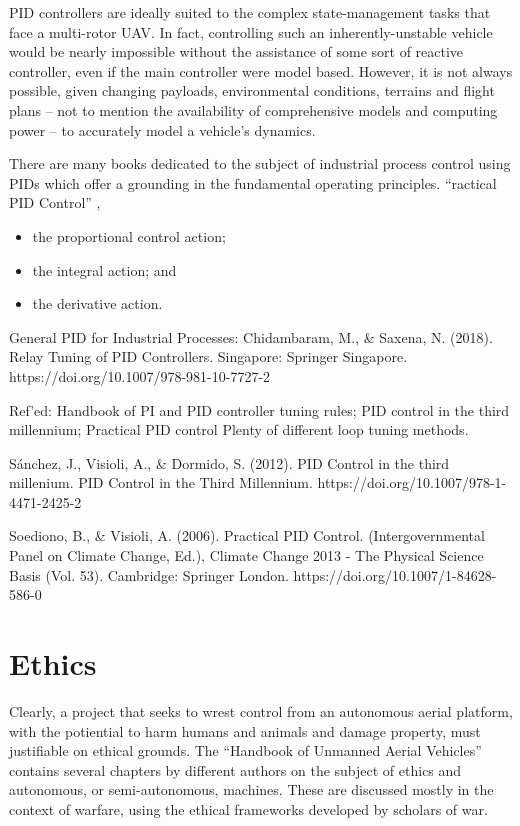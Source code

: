 \documentclass[10pt]{article}
\begin{document}
PID controllers are ideally suited to the complex state-management tasks that face a multi-rotor UAV. In fact, controlling such an inherently-unstable vehicle would be nearly impossible without the assistance of some sort of reactive controller, even if the main controller were model based. However, it is not always possible, given changing payloads, environmental conditions, terrains and flight plans -- not to mention the availability of comprehensive models and computing power -- to accurately model a vehicle’s dynamics.

There are many books dedicated to the subject of industrial process control using PIDs which offer a grounding in the fundamental operating principles. ``ractical PID Control'' \cite{Soediono1989}, 

\begin{itemize}
\item the proportional control action;
\item the integral action; and
\item the derivative action.
\end{itemize}

General PID for Industrial Processes:
\cite{Saxena}
Chidambaram, M., \& Saxena, N. (2018). Relay Tuning of PID Controllers. Singapore: Springer Singapore. https://doi.org/10.1007/978-981-10-7727-2

Ref’ed: Handbook of PI and  PID controller tuning rules; PID control in the third millennium; Practical PID control
Plenty of different loop tuning methods.

\cite{Sanchez2012}
Sánchez, J., Visioli, A., \& Dormido, S. (2012). PID Control in the third millenium. PID Control in the Third Millennium. https://doi.org/10.1007/978-1-4471-2425-2

\cite{Soediono1989}
Soediono, B., \& Visioli, A. (2006). Practical PID Control. (Intergovernmental Panel on Climate Change, Ed.), Climate Change 2013 - The Physical Science Basis (Vol. 53). Cambridge: Springer London. https://doi.org/10.1007/1-84628-586-0

\section{Ethics}

Clearly, a project that seeks to wrest control from an autonomous aerial platform, with the potiential to harm humans and animals and damage property, must justifiable on ethical grounds. The ``Handbook of Unmanned Aerial Vehicles'' \cite{Valavanis2015j} contains several chapters by different authors on the subject of ethics and autonomous, or semi-autonomous, machines. These are discussed mostly in the context of warfare, using the ethical frameworks developed by scholars of war.
\end{document}
